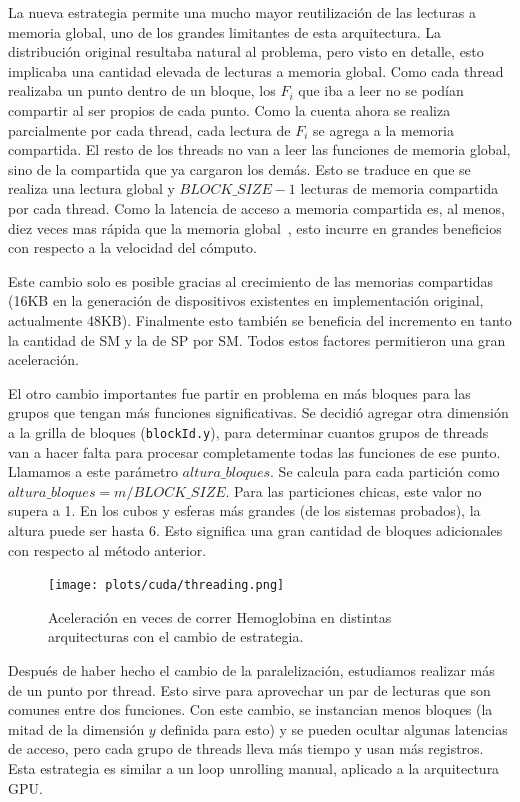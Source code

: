 La nueva estrategia permite una mucho mayor reutilizaci\'on de las lecturas a memoria
global, uno de los grandes limitantes de esta arquitectura.
La distribuci\'on original resultaba natural al problema, pero visto en detalle, esto
implicaba una cantidad elevada de lecturas a memoria global. Como cada thread realizaba un
punto dentro de un bloque, los $F_i$ que iba a leer no se pod\'ian compartir al ser
propios de cada punto. Como la cuenta ahora se realiza parcialmente por cada thread,
cada lectura de $F_i$ se agrega a la memoria compartida. El resto de los threads no van
a leer las funciones  de memoria global, sino de la compartida que ya cargaron los dem\'as. Esto
se traduce en que se realiza una lectura global y $BLOCK\_SIZE-1$ lecturas
de memoria compartida por cada thread. Como la latencia de acceso a memoria compartida
es, al menos, diez veces mas r\'apida que la memoria global~\cite{Demystifying}, esto incurre en grandes
beneficios con respecto a la velocidad del c\'omputo.

Este cambio solo es posible gracias al crecimiento de las memorias compartidas (16KB en la generaci\'on de
dispositivos existentes en implementaci\'on original, actualmente 48KB). Finalmente
esto tambi\'en se beneficia del incremento en tanto la cantidad de SM y la de SP por
SM. Todos estos factores permitieron una gran aceleraci\'on.

El otro cambio importantes fue partir en problema en m\'as bloques para las grupos que tengan
m\'as funciones significativas. Se decidi\'o agregar otra dimensi\'on a la grilla de bloques (\texttt{blockId.y}),
para determinar cuantos grupos de threads van a hacer falta para procesar completamente
todas las funciones de ese punto. Llamamos a este par\'ametro $altura\_bloques$. Se
calcula para cada partici\'on como $altura\_bloques = {m}/{BLOCK\_SIZE}$.
Para las particiones chicas, este valor no supera a 1. En los cubos y esferas m\'as
grandes (de los sistemas probados), la altura puede ser hasta 6. Esto significa una gran
cantidad de bloques adicionales con respecto al m\'etodo anterior.

\begin{figure}[htbp]
   \centering
   \texttt{[image: plots/cuda/threading.png]}
   \caption{Aceleraci\'on en veces de correr Hemoglobina en distintas arquitecturas con el cambio de estrategia.}
   \label{plt:threading}
\end{figure}


Despu\'es de haber hecho el cambio de la paralelizaci\'on, estudiamos realizar
m\'as de un punto por thread. Esto sirve para aprovechar un par de lecturas que son comunes
entre dos funciones. Con este cambio, se instancian menos bloques (la mitad de la dimensi\'on $y$
definida para esto) y se pueden ocultar algunas latencias de acceso, pero
cada grupo de threads lleva m\'as tiempo y usan m\'as registros. Esta estrategia es similar
a un loop unrolling manual, aplicado a la arquitectura GPU.


